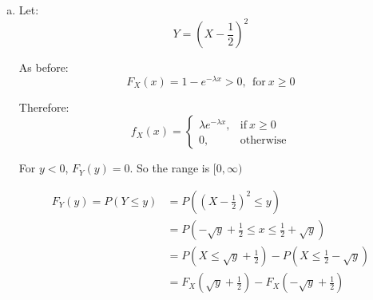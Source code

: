 \documentclass[11pt]{extarticle}
\begin{document}
\begin{enumerate}[(a)]
\begin{proof}
$$ f_X(x) = \frac{\partial}{\partial x} F_X(x) = \lambda e^{- \lambda x} $$


Mean: $$ \mu = E(X) = \int_{0}^{\infty} x f_X(x) dx = \int_{0}^{\infty} x \lambda e^{- \lambda x} dx  $$ 
$$ =  -x e^{-\lambda x}\Big|_0^\infty + \frac{-1}{\lambda} e^{-\lambda x} \Big|^\infty_0 = \boxed{\frac{1}{\lambda} } $$

Variance: $$ \sigma^2 = Var(X) = E(X^2) - E(X)^2  $$ $$=  \left( \int_{0}^{\infty} x^2 \lambda e^{- \lambda x} dx  \right) - \left( \frac{1}{\lambda} \right)^2 $$ 

$$ = \left( \frac{2}{\lambda^2} \right)  - \left( \frac{1}{\lambda} \right)^2 = \boxed{\frac{1}{\lambda^2}} $$


\end{proof}

\item 





Let: $$Y=\left(X-\frac{1}{2} \right)^2$$

As before: $$F_X(x) = 1-e^{-\lambda x} > 0,\ \ \text{for}\ x \geq  0$$





Therefore: $$ f_X(x) =
	\begin{cases}
		 \lambda e^{-\lambda x}, & \text{if}\  x \geq 0 \\
		0, & \text{otherwise}
	\end{cases}
$$

For $y < 0$, $F_Y(y) = 0$. So the range is $\boxed{ [0, \infty) }$

\begin{align*}F_Y(y) = P(Y \leq y) & = P\left( \left(X-\frac{1}{2} \right)^2\leq y\right) \\
& = P \left( -\sqrt{y}+\frac{1}{2} \leq x \leq \frac{1}{2} + \sqrt{y} \right) \\
& = P \left( X \leq \sqrt{y} + \frac{1}{2} \right) - P \left(X \leq \frac{1}{2} - \sqrt{y} \right) \\
& = F_X \left(\sqrt{y}+\frac{1}{2} \right) - F_X \left(-\sqrt{y} + \frac{1}{2} \right)
\end{align*}



\end{enumerate}
\end{document}
